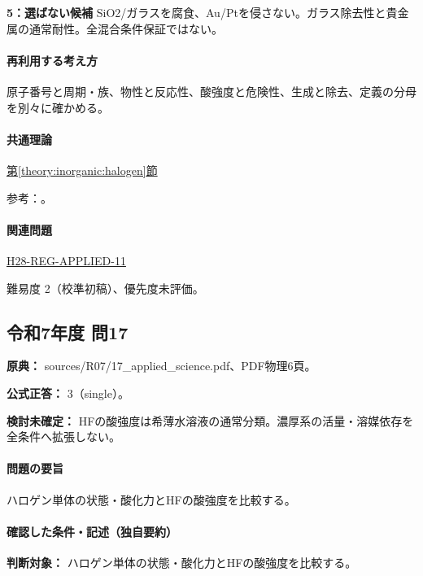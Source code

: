 \noindent\textbf{5：選ばない候補} SiO2/ガラスを腐食、Au/Ptを侵さない。ガラス除去性と貴金属の通常耐性。全混合条件保証ではない。\par

\paragraph{再利用する考え方} 原子番号と周期・族、物性と反応性、酸強度と危険性、生成と除去、定義の分母を別々に確かめる。

\paragraph{共通理論} \hyperref[theory:inorganic:halogen]{第\ref*{theory:inorganic:halogen}節}

\par 参考：\cite{niosh_hf,yale_hydrohalic}。

\paragraph{関連問題} \hyperref[q:h28-reg-applied-11]{H28-REG-APPLIED-11}

\par 難易度 2（校準初稿）、優先度未評価。

\subsection{令和7年度 問17}
\label{q:r07-reg-applied-17}

\noindent\textbf{原典：} sources/R07/17\_applied\_science.pdf、PDF物理6頁。

\textbf{公式正答：} 3（single）。

\par\textbf{検討未確定：} HFの酸強度は希薄水溶液の通常分類。濃厚系の活量・溶媒依存を全条件へ拡張しない。

\paragraph{問題の要旨} ハロゲン単体の状態・酸化力とHFの酸強度を比較する。

\paragraph{確認した条件・記述（独自要約）}\mbox{}\par

\noindent\textbf{判断対象：} ハロゲン単体の状態・酸化力とHFの酸強度を比較する。\par

